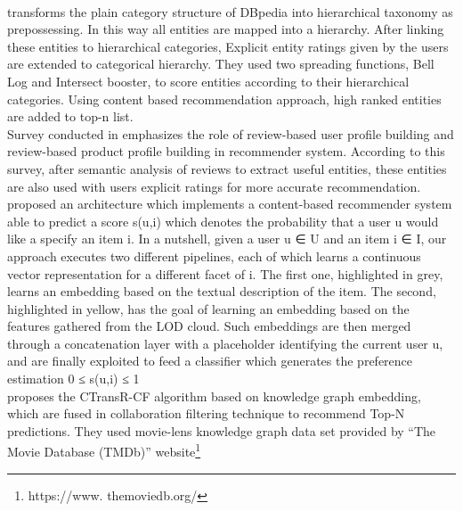 \\
\cite{N15} transforms the plain category structure of DBpedia into hierarchical taxonomy as prepossessing. In this way all entities are mapped into a hierarchy. After linking these entities to hierarchical categories, Explicit entity ratings given by the users are extended to categorical hierarchy. They used two spreading functions, Bell Log and Intersect booster, to score entities according to their hierarchical categories. Using content based recommendation approach, high ranked entities are added to top-n list. 
\\
Survey conducted in \cite{N23} emphasizes the role of review-based user profile building and review-based product profile building in recommender system. According to this survey, after semantic analysis of reviews to extract useful entities, these entities are also used with users explicit ratings for more accurate recommendation. 
\\
\cite{N31} proposed an architecture which implements a content-based recommender system able to predict a score s(u,i) which denotes the probability that a user u would like a specify an item i.
In a nutshell, given a user u ∈ U and an item i ∈ I, our approach executes two different pipelines, each of which learns a continuous vector representation for a different facet of i. The  first one, highlighted in grey, learns an embedding based on the textual description of the item. The second, highlighted in yellow, has the goal of learning an embedding based on the features gathered from the LOD cloud. Such embeddings are then merged through a concatenation layer with a placeholder identifying the current user u, and are finally exploited to feed a classifier which generates the preference estimation 0 ≤ s(u,i) ≤ 1
\\
\cite{N21} proposes the CTransR-CF algorithm based on knowledge graph embedding, which are fused in collaboration filtering technique to recommend Top-N predictions. They used movie-lens knowledge graph data set provided by “The Movie Database (TMDb)” website\footnote{https://www. themoviedb.org/}
\\
